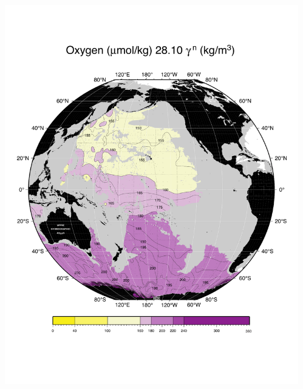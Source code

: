 \documentclass{beamer}
\begin{document}
\begin{frame}[plain,t]
\begin{columns}
\begin{column}{0.33\textwidth}
          \includegraphics[width=\textwidth]{oxygen_isopyc_final_pdf/pac2810_oxygen_final.pdf}  
      \end{column}
      \begin{column}{0.33\textwidth}

\end{column}
\end{columns}
\end{frame}
\end{document}
